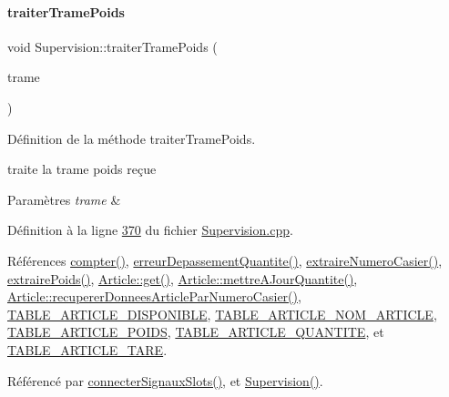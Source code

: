 \paragraph{\texorpdfstring{traiter\+Trame\+Poids}{traiterTramePoids}}
{\footnotesize\ttfamily void Supervision\+::traiter\+Trame\+Poids (\begin{DoxyParamCaption}\item[{Q\+String}]{trame }\end{DoxyParamCaption})\hspace{0.3cm}{\ttfamily [slot]}}



Définition de la méthode traiter\+Trame\+Poids. 

traite la trame poids reçue 
\begin{DoxyParams}{Paramètres}
{\em trame} & \\
\hline
\end{DoxyParams}


Définition à la ligne \hyperlink{_supervision_8cpp_source_l00370}{370} du fichier \hyperlink{_supervision_8cpp_source}{Supervision.\+cpp}.



Références \hyperlink{_supervision_8cpp_source_l00452}{compter()}, \hyperlink{class_supervision_a3fb19a3c16324a21af956fd272ca469d}{erreur\+Depassement\+Quantite()}, \hyperlink{_supervision_8cpp_source_l00433}{extraire\+Numero\+Casier()}, \hyperlink{_supervision_8cpp_source_l00415}{extraire\+Poids()}, \hyperlink{_article_8cpp_source_l00266}{Article\+::get()}, \hyperlink{_article_8cpp_source_l00329}{Article\+::mettre\+A\+Jour\+Quantite()}, \hyperlink{_article_8cpp_source_l00156}{Article\+::recuperer\+Donnees\+Article\+Par\+Numero\+Casier()}, \hyperlink{_article_8h_source_l00041}{T\+A\+B\+L\+E\+\_\+\+A\+R\+T\+I\+C\+L\+E\+\_\+\+D\+I\+S\+P\+O\+N\+I\+B\+LE}, \hyperlink{_article_8h_source_l00033}{T\+A\+B\+L\+E\+\_\+\+A\+R\+T\+I\+C\+L\+E\+\_\+\+N\+O\+M\+\_\+\+A\+R\+T\+I\+C\+LE}, \hyperlink{_article_8h_source_l00042}{T\+A\+B\+L\+E\+\_\+\+A\+R\+T\+I\+C\+L\+E\+\_\+\+P\+O\+I\+DS}, \hyperlink{_article_8h_source_l00040}{T\+A\+B\+L\+E\+\_\+\+A\+R\+T\+I\+C\+L\+E\+\_\+\+Q\+U\+A\+N\+T\+I\+TE}, et \hyperlink{_article_8h_source_l00043}{T\+A\+B\+L\+E\+\_\+\+A\+R\+T\+I\+C\+L\+E\+\_\+\+T\+A\+RE}.



Référencé par \hyperlink{_supervision_8cpp_source_l00273}{connecter\+Signaux\+Slots()}, et \hyperlink{_supervision_8cpp_source_l00036}{Supervision()}.


